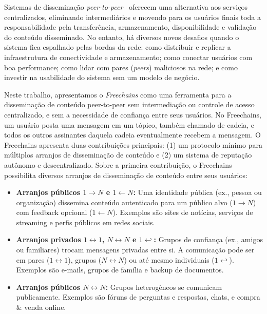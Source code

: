 \documentclass[12pt]{article}
\newcommand{\FC} {Freechains\xspace}
\newcommand{\Xon} {$1{\rightarrow}N$\xspace}
\newcommand{\Xno} {$1{\leftarrow}N$\xspace}
\newcommand{\Xnn} {$N{\leftrightarrow}N$\xspace}
\newcommand{\Xoo} {$1{\leftrightarrow}1$\xspace}
\newcommand{\Xo}  {$1{\hookleftarrow}$\xspace}
\begin{document}
Sistemas de disseminação \emph{peer-to-peer}~\cite{p2p.survey} oferecem uma
alternativa aos serviços centralizados, eliminando intermediários e movendo
para os usuários finais toda a responsabilidade pela transferência,
armazenamento, disponibilidade e validação do conteúdo disseminado.
No entanto, há diversos novos desafios quando o sistema fica espalhado pelas
bordas da rede:
    como distribuir e replicar a infraestrutura de conectividade e
    armazenamento;
    como conectar usuários com boa performance;
    como lidar com pares (\emph{peers}) maliciosos na rede;
    e como investir na usabilidade do sistema sem um modelo de negócio.

Neste trabalho, apresentamos o \emph{\FC} como uma ferramenta para a
disseminação de conteúdo peer-to-peer sem intermediação ou controle de acesso
centralizado, e sem a necessidade de confiança entre seus usuários.
No \FC, um usuário posta uma mensagem em um tópico, também chamado de
cadeia, e todos os outros assinantes daquela cadeia eventualmente recebem a
mensagem.
O \FC apresenta duas contribuições principais: (1) um protocolo mínimo para
múltiplos arranjos de disseminação de conteúdo e (2) um sistema de reputação
autônomo e descentralizado.
%
Sobre a primeira contribuição, o \FC possibilita diversos arranjos de
disseminação de conteúdo entre seus usuários:
%
\begin{itemize}
\item \textbf{Arranjos públicos \Xon e \Xno:}
    Uma identidade pública (ex., pessoa ou organização) dissemina conteúdo
    autenticado para um público alvo (\Xon) com feedback opcional (\Xno).
    Exemplos são sites de notícias, serviços de streaming e perfis públicos em
    redes sociais.
\item \textbf{Arranjos privados \Xoo, \Xnn e \Xo:}
    Grupos de confiança (ex., amigos ou familiares) trocam mensagens privadas
    entre si.
    A comunicação pode ser em pares (\Xoo), grupos (\Xnn) ou até mesmo
    individuais (\Xo).
    Exemplos são e-mails, grupos de família e backup de documentos.
\item \textbf{Arranjos públicos \Xnn:}
    Grupos heterogêneos se comunicam publicamente. Exemplos são fóruns de
    perguntas e respostas, chats, e compra \& venda online.
\end{itemize}
%
\end{document}
